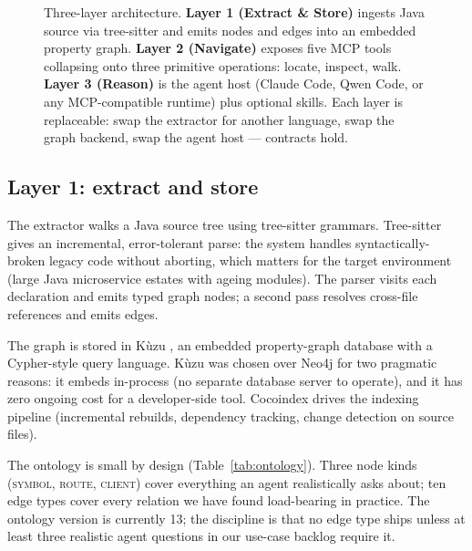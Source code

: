 \documentclass[11pt,a4paper]{article}
\begin{document}
\begin{figure}[H]
\centering

\caption{Three-layer architecture. \textbf{Layer 1 (Extract \& Store)} ingests Java source via tree-sitter and emits nodes and edges into an embedded property graph. \textbf{Layer 2 (Navigate)} exposes five MCP tools collapsing onto three primitive operations: locate, inspect, walk. \textbf{Layer 3 (Reason)} is the agent host (Claude Code, Qwen Code, or any MCP-compatible runtime) plus optional skills. Each layer is replaceable: swap the extractor for another language, swap the graph backend, swap the agent host --- contracts hold.}
\label{fig:layers}
\end{figure}

\subsection{Layer 1: extract and store}
\label{sec:layer1}

The extractor walks a Java source tree using tree-sitter \cite{treesitter} grammars. Tree-sitter gives an incremental, error-tolerant parse: the system handles syntactically-broken legacy code without aborting, which matters for the target environment (large Java microservice estates with ageing modules). The parser visits each declaration and emits typed graph nodes; a second pass resolves cross-file references and emits edges.

The graph is stored in K\`uzu \cite{kuzu2023}, an embedded property-graph database with a Cypher-style query language. K\`uzu was chosen over Neo4j for two pragmatic reasons: it embeds in-process (no separate database server to operate), and it has zero ongoing cost for a developer-side tool. Cocoindex \cite{cocoindex2024} drives the indexing pipeline (incremental rebuilds, dependency tracking, change detection on source files).

The ontology is small by design (Table~\ref{tab:ontology}). Three node kinds (\textsc{symbol}, \textsc{route}, \textsc{client}) cover everything an agent realistically asks about; ten edge types cover every relation we have found load-bearing in practice. The ontology version is currently 13; the discipline is that no edge type ships unless at least three realistic agent questions in our use-case backlog require it.
\end{document}
